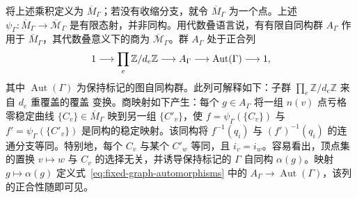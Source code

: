将上述乘积定义为 $\overline M_\Gamma$；若没有收缩分支，就令 $\overline M_\Gamma$ 为一个点。上述 $\psi_\Gamma:\overline M_\Gamma\to\overline{\mathcal M}_\Gamma$ 是有限态射，并非同构。用代数叠语言说，有有限自同构群 $A_\Gamma$ 作用于 $\overline M_\Gamma$，其代数叠意义下的商为 $\overline{\mathcal M}_\Gamma$。群 $A_\Gamma$ 处于正合列
\begin{equation}\label{eq:fixed-graph-automorphisms}\index{稳定映射!自同构群|hyperpage}
1\longrightarrow\prod_e\mathbb Z/d_e\mathbb Z\longrightarrow A_\Gamma
\longrightarrow\operatorname{Aut}(\Gamma)\longrightarrow1,
\end{equation}
其中 $\operatorname{Aut}(\Gamma)$ 为保持标记的图自同构群。此列可解释如下：子群 $\prod_e\mathbb Z/d_e\mathbb Z$ 来自 $d_e$ 重覆盖的覆盖
变换。商映射如下产生：每个 $g\in A_\Gamma$ 将一组 $n(v)$ 点亏格零稳定曲线 $\{C_v\}\in\overline M_\Gamma$ 映到另一组 $\{C'_v\}$，使 $f=\psi_\Gamma(\{C_v\})$ 与 $f'=\psi_\Gamma(\{C'_v\})$ 是同构的稳定映射。该同构将 $f^{-1}(q_i)$ 与 $(f')^{-1}(q_i)$ 的连通分支等同。特别地，每个 $C_v$ 与某个 $C'_w$ 等同，且 $i_v=i_w$。容易看出，顶点集的置换 $v\mapsto w$ 与 $C_v$ 的选择无关，并诱导保持标记的 $\Gamma$ 自同构 $\alpha(g)$。映射 $g\mapsto\alpha(g)$ 定义式~\eqref{eq:fixed-graph-automorphisms} 中的 $A_\Gamma\to\operatorname{Aut}(\Gamma)$，该列的正合性随即可见。

